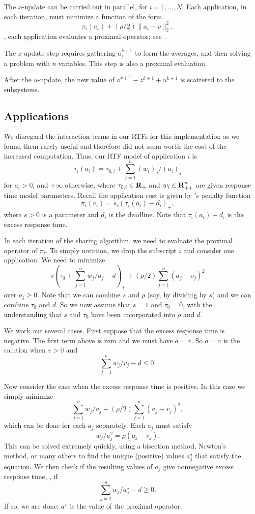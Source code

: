 The $x$-update can be carried out in parallel, for $i=1, \ldots, N$.
Each application, in each iteration, must minimize a function of the form
\[
\pi_i(a_i) + (\rho/2) \|a_i - v\|_2^2,
\]
\ie, each application evaluates a proximal operator; see~\cite{ProxAlgs}.

The $z$-update step requires
gathering $a_i^{k+1}$ to form the averages, and then solving a problem
with $n$ variables.  This step is also a proximal evaluation.

After the $u$-update, the new value of $\overline a^{k+1}-
z^{k+1}+u^{k+1}$ is scattered to the subsystems.

\subsection{Applications}

We disregard the interaction terms in our RTFs for this implementation as we found them rarely useful and therefore did not seem worth the cost of the increased computation. Thus, our RTF model of application $i$ is
\[
\tau_i(a_i) = \tau_{0,i} + \sum_{j=1}^n (w_i)_j/(a_i)_j
\]
for $a_i >0$, and $+\infty$ otherwise, where $\tau_{0,i} \in {\mbox{\textbf{R}}}_+$ and 
$w_i \in {\mbox{\textbf{R}}}_{++}^n$ are given response time model parameters.
Recall the application cost is given by \pacora's penalty function
\[
\pi_i(a_i) = s_i (\tau_i(a_i) - d_i)_+,
\]
where $s >0$ is a parameter and $d_i$ is the deadline.
Note that $\tau_i(a_i)-d_i$ is the excess response time.

In each iteration of the sharing algorithm, 
we need to evaluate the proximal operator of $\pi_i$.
To simply notation, we drop the subscript $i$ and consider one
application.
We need to minimize
\[
s \left(\tau_0 + \sum_{j=1}^n w_j/a_j - d\right)_+ + 
(\rho/2)\sum_{j=1}^n (a_j - v_j)^2
\]
over $a_j\geq 0$.
Note that we can combine $s$ and $\rho$ (say, by dividing by
$s$) and we can combine $\tau_0$ and $d$.  So we now 
assume that $s =1$ and $\tau_0=0$, with the understanding that
$s$ and $\tau_0$ have been incorporated into $\rho$ and $d$.

We work out several cases.  First suppose that the excess response time
is negative.  
The first term above is zero and we must have $a=v$.  So $a=v$ is
the solution when $v>0$ and
\[
\sum_{j=1}^n w_j/v_j - d \leq 0.
\]

Now consider the case when the excess response time is positive.  In this case
we simply minimize
\[
\sum_{j=1}^n w_j/a_j +
(\rho/2)\sum_{j=1}^n (a_j - v_j)^2,
\]
which can be done for each $a_j$ separately.
Each $a_j$ must satisfy
\[
w_j/a_j^2  = \rho(a_j - v_j).
\]
This can be solved extremely quickly, using a bisection method, Newton's
method, or many others to find the unique (positive) 
values $a_j^\star$ that satisfy
the equation.
We then check if the resulting values of $a_j$ give nonnegative
excess response time, \ie, if 
\[
\sum_{j=1}^n w_j/a_j^\star - d  \geq 0.
\]
If so, we are done: $a^\star$ is the value of the proximal operator.

